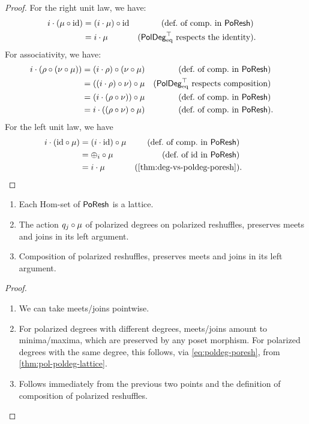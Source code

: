 \documentclass[a4paper]{memoir}
\begin{document}
\begin{proof}
	For the right unit law, we have:
	\begin{align*}
		i \cdot (\mu \circ \mathrm{id})
		&= (i \cdot \mu) \circ \mathrm{id}
		& \text{(def.\ of comp.\ in $\mathsf{PoResh}$)} \\
		&= i \cdot \mu
		& \text{($\mathsf{PolDeg}_{\mathrm{eq}}^\top$ respects the identity)}&.
	\end{align*}
	For associativity, we have:
	\begin{align*}
		i \cdot (\rho \circ (\nu \circ \mu))
		&= (i \cdot \rho) \circ (\nu \circ \mu)
		& \text{(def.\ of comp.\ in $\mathsf{PoResh}$)} \\
		&= ((i \cdot \rho) \circ \nu) \circ \mu
		& \text{($\mathsf{PolDeg}_{\mathrm{eq}}^\top$ respects composition)} \\
		&= (i \cdot (\rho \circ \nu)) \circ \mu
		& \text{(def.\ of comp.\ in $\mathsf{PoResh}$)} \\
		&= i \cdot ((\rho \circ \nu) \circ \mu)
		& \text{(def.\ of comp.\ in $\mathsf{PoResh}$)}&.
	\end{align*}
	For the left unit law, we have
	\begin{align*}
		i \cdot (\id \circ \mu)
		&= (i \cdot \id) \circ \mu
		& \text{(def.\ of comp.\ in $\poreshcat$)} \\
		&= \pospol_i \circ \mu
		& \text{(def.\ of $\id$ in $\poreshcat$)} \\
		&= i \cdot \mu
		& \text{(\cref{thm:deg-vs-poldeg-poresh})}&.
		\qquad \qedhere
	\end{align*}
\end{proof}
\begin{proposition}
	\label{thm:poresh-lattice}
	\label{thm:poldeg-poresh-lattice}
	\label{thm:poresh-poresh-lattice}
	\begin{enumerate}
		\item Each Hom-set of $\mathsf{PoResh}$ is a lattice.
		\item The action ${q}_{j} \circ \mu$ of polarized degrees on polarized reshuffles, preserves meets and joins in its left argument.
		\item Composition of polarized reshuffles, preserves meets and joins in its left argument.
	\end{enumerate}
\end{proposition}
\begin{proof}
	\begin{enumerate}
		\item We can take meets/joins pointwise.
		\item For polarized degrees with different degrees, meets/joins amount to minima/maxima, which are preserved by any poset morphism.
		For polarized degrees with the same degree, this follows, via \cref{eq:poldeg-poresh}, from \ref{thm:pol-poldeg-lattice}.
		\item Follows immediately from the previous two points and the definition of composition of polarized reshuffles. \qedhere
	\end{enumerate}
\end{proof}
\end{document}

